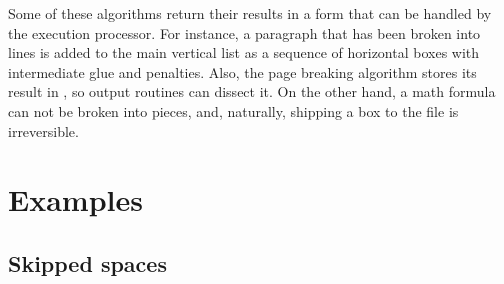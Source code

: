 \documentclass[letterpaper]{book}
\begin{document}
Some of these algorithms return their results in a form that
can be handled by the execution processor. For instance,
a paragraph that has been broken into lines is added to
the main vertical list as a sequence of horizontal boxes
with intermediate glue and penalties. Also, the page breaking
algorithm stores its result in , so output
routines can dissect it. On the other hand, a math formula
can not be broken into pieces, and, naturally, 
shipping a box to the  file is irreversible.

\section{Examples}

\subsection{Skipped spaces}
\end{document}

